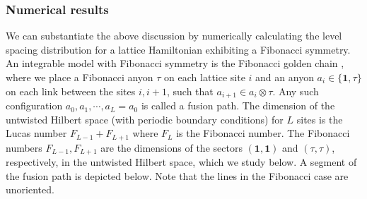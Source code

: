 \documentclass[11pt]{article}
\numberwithin{equation}{section}
\begin{document}
\subsubsection{Numerical results}\label{sec:fibnum}
We can substantiate the above discussion by numerically calculating the  level spacing distribution for a lattice Hamiltonian exhibiting a Fibonacci symmetry. An integrable model with Fibonacci symmetry is the Fibonacci golden chain \cite{Feiguin:2006ydp}, where we place a Fibonacci anyon $\tau$ on each lattice site $i$ and an anyon $a_i \in \{\mathbf 1,\tau\}$ on each link between the sites $i,i+1$, such that $a_{i+1} \in a_i \otimes \tau$. Any such configuration $a_0, a_1, \cdots, a_L=a_0$ is called a fusion path. The dimension of the untwisted Hilbert space (with periodic boundary conditions) for $L$ sites is the Lucas number $F_{L-1}+F_{L+1}$ where $F_L$ is the Fibonacci number. The Fibonacci numbers $F_{L-1},F_{L+1}$ are the dimensions of the sectors $(\mathbf 1,\mathbf 1)$ and $(\tau,\tau)$, respectively, in the untwisted Hilbert space, which we study below. A segment of the fusion path is depicted below. Note that the lines in the Fibonacci case are unoriented.


\begin{center}
\end{center}
\end{document}
